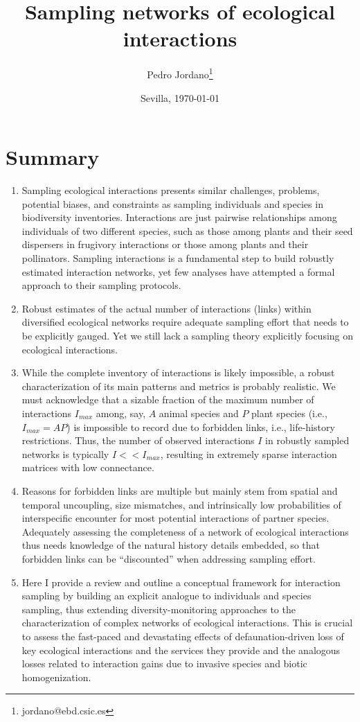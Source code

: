 \documentclass[12pt]{article}
\title{Sampling networks of ecological interactions}
\author[a]{Pedro Jordano\thanks{jordano@ebd.csic.es}}
\affil[a]{Integrative Ecology Group, Estaci\'on Biol\'ogica de Do\~nana, Consejo Superior de Investigaciones Cient\'ificas (EBD-CSIC), Avenida Americo Vespucio s\slash n, E--41092 Sevilla, Spain}
\date{Sevilla, \today}
\begin{document}
\maketitle
\section*{Summary}
\begin{enumerate}
\item Sampling ecological interactions presents similar challenges, problems, potential biases, and constraints as sampling individuals and species in biodiversity inventories. Interactions are just pairwise relationships among individuals of two different species, such as those among plants and their seed dispersers in frugivory interactions or those among plants and their pollinators. Sampling interactions is a fundamental step to build robustly estimated interaction networks, yet few analyses have attempted a formal approach to their sampling protocols.

\item Robust estimates of the actual number of interactions (links) within diversified ecological networks require adequate sampling effort that needs to be explicitly gauged. Yet we still lack a sampling theory explicitly focusing on ecological interactions.

\item While the complete inventory of interactions is likely impossible, a robust characterization of its main patterns and metrics is probably realistic. We must acknowledge that a sizable fraction of the maximum number of interactions $I_{max}$ among, say, $A$ animal species and $P$ plant species (i.e., $I_{max}= AP$) is impossible to record due to forbidden links, i.e., life-history restrictions. Thus, the number of observed interactions $I$ in robustly sampled networks is typically $I<<I_{max}$, resulting in extremely sparse interaction matrices with low connectance.

\item Reasons for forbidden links are multiple but mainly stem from spatial and temporal uncoupling, size mismatches, and intrinsically low probabilities of interspecific encounter for most potential interactions of partner species. Adequately assessing the completeness of a network of ecological interactions thus needs knowledge of the natural history details embedded, so that forbidden links can be ``discounted'' when addressing sampling effort.

\item Here I provide a review and outline a conceptual framework for interaction sampling by building an explicit analogue to individuals and species sampling, thus extending diversity-monitoring approaches to the characterization of complex networks of ecological interactions. This is crucial to assess the fast-paced and devastating effects of defaunation-driven loss of key ecological interactions and the services they provide and the analogous losses related to interaction gains due to invasive species and biotic homogenization.
\end{enumerate}
%
\end{document}
